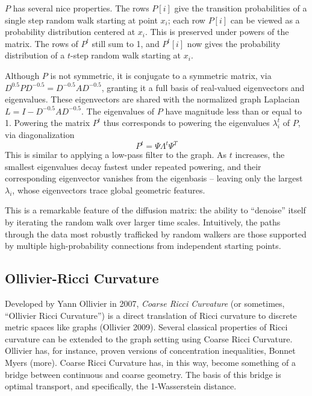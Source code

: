 \documentclass[
  letterpaper,
  DIV=11,
  numbers=noendperiod]{scrartcl}
\theoremstyle{plain}
\theoremstyle{plain}
\theoremstyle{definition}
\theoremstyle{plain}
\theoremstyle{definition}
\theoremstyle{plain}
\theoremstyle{remark}
\begin{document}
\(P\) has several nice properties. The rows \(P[i]\) give the transition
probabilities of a single step random walk starting at point \(x_{i}\);
each row \(P[i]\) can be viewed as a probability distribution centered
at \(x_{i}\). This is preserved under powers of the matrix. The rows of
\(P^t\) still sum to 1, and \(P^t[i]\) now gives the probability
distribution of a \(t\)-step random walk starting at \(x_{i}\).

Although \(P\) is not symmetric, it is conjugate to a symmetric matrix,
via \(D^{0.5}PD^{-0.5} = D^{-0.5}AD^{-0.5}\), granting it a full basis
of real-valued eigenvectors and eigenvalues. These eigenvectors are
shared with the normalized graph Laplacian
\(L = I - D^{-0.5}AD^{-0.5}\). The eigenvalues of \(P\) have magnitude
less than or equal to 1. Powering the matrix \(P^t\) thus corresponds to
powering the eigenvalues \(\lambda_{i}^t\) of \(P\), via diagonalization
\[
P^t = \Psi \Lambda^t \Psi^T
\] This is similar to applying a low-pass filter to the graph. As \(t\)
increases, the smallest eigenvalues decay fastest under repeated
powering, and their corresponding eigenvector vanishes from the
eigenbasis -- leaving only the largest \(\lambda_{i}\), whose
eigenvectors trace global geometric features.

This is a remarkable feature of the diffusion matrix: the ability to
``denoise'' itself by iterating the random walk over larger time scales.
Intuitively, the paths through the data most robustly trafficked by
random walkers are those supported by multiple high-probability
connections from independent starting points.

\subsection{Ollivier-Ricci Curvature}\label{ollivier-ricci-curvature}

Developed by Yann Ollivier in 2007, \emph{Coarse Ricci Curvature} (or
sometimes, ``Ollivier Ricci Curvature'') is a direct translation of
Ricci curvature to discrete metric spaces like graphs (Ollivier 2009).
Several classical properties of Ricci curvature can be extended to the
graph setting using Coarse Ricci Curvature. Ollivier has, for instance,
proven versions of concentration inequalities, Bonnet Myers (more).
Coarse Ricci Curvature has, in this way, become something of a bridge
between continuous and coarse geometry. The basis of this bridge is
optimal transport, and specifically, the 1-Wasserstein distance.
\end{document}
